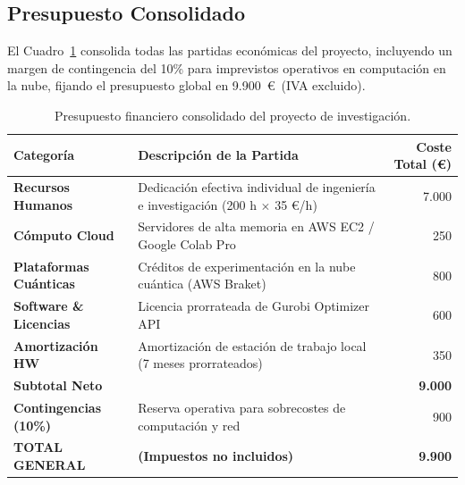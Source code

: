 \subsection{Presupuesto Consolidado}
\label{subsec:presupuesto_consolidado}

El Cuadro~\ref{tab:presupuesto_consolidado} consolida todas las partidas económicas del proyecto, incluyendo un margen de contingencia del 10\% para imprevistos operativos en computación en la nube, fijando el presupuesto global en 9.900~\euro\ (IVA excluido).

\begin{table}[htbp]
    \centering
    \small
    \caption{Presupuesto financiero consolidado del proyecto de investigación.}
    \label{tab:presupuesto_consolidado}
    \renewcommand{\arraystretch}{1.25}
    \begin{tabular}{p{3.2cm}p{6.5cm}r}
        \toprule
        \textbf{Categoría} & \textbf{Descripción de la Partida} & \textbf{Coste Total (\euro)} \\
        \midrule
        \textbf{Recursos Humanos} & Dedicación efectiva individual de ingeniería e investigación (200 h $\times$ 35 \euro/h) & 7.000 \\
        \textbf{Cómputo Cloud} & Servidores de alta memoria en AWS EC2 / Google Colab Pro & 250 \\
        \textbf{Plataformas Cuánticas} & Créditos de experimentación en la nube cuántica (AWS Braket) & 800 \\
        \textbf{Software \& Licencias} & Licencia prorrateada de Gurobi Optimizer API & 600 \\
        \textbf{Amortización HW} & Amortización de estación de trabajo local (7 meses prorrateados) & 350 \\
        \addlinespace
        \textbf{Subtotal Neto} & & \textbf{9.000} \\
        \textbf{Contingencias (10\%)} & Reserva operativa para sobrecostes de computación y red & 900 \\
        \midrule
        \textbf{TOTAL GENERAL} & \textbf{(Impuestos no incluidos)} & \textbf{9.900} \\
        \bottomrule
    \end{tabular}
\end{table}